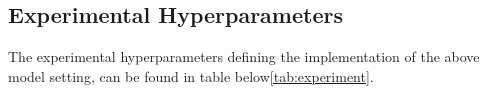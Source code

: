 




%


%


\subsection{Experimental Hyperparameters}\label{subsec:experiement}

The experimental hyperparameters defining the implementation of the above model setting, can be found in
table below\ref{tab:experiment}.

